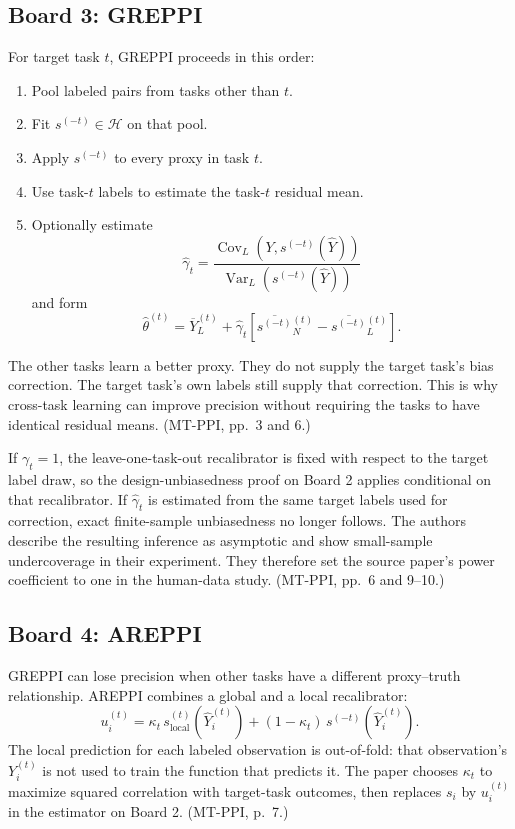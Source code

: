 \documentclass[11pt]{article}
\newcommand{\Var}{\operatorname{Var}}
\newcommand{\Cov}{\operatorname{Cov}}
\begin{document}
  \subsection*{Board 3: GREPPI}
  
  For target task \(t\), GREPPI proceeds in this order:
  \begin{enumerate}[leftmargin=2em]
      \item Pool labeled pairs from tasks other than \(t\).
      \item Fit \(s^{(-t)}\in\mathcal H\) on that pool.
      \item Apply \(s^{(-t)}\) to every proxy in task \(t\).
      \item Use task-\(t\) labels to estimate the task-\(t\) residual mean.
      \item Optionally estimate
      \[
          \widehat\gamma_t
          =
          \frac{\Cov_L(Y,s^{(-t)}(\widehat Y))}
               {\Var_L(s^{(-t)}(\widehat Y))}
      \]
      and form
      \[
          \widehat\theta^{(t)}
          =
          \overline Y_L^{(t)}
          +
          \widehat\gamma_t
          \left[
            \overline{s^{(-t)}}{}_N^{(t)}
            -
            \overline{s^{(-t)}}{}_L^{(t)}
          \right].
      \]
  \end{enumerate}
  The other tasks learn a better proxy. They do not supply the target task's
  bias correction. The target task's own labels still supply that correction.
  This is why cross-task learning can improve precision without requiring the
  tasks to have identical residual means. (MT-PPI, pp.~3 and 6.)
  
  If \(\gamma_t=1\), the leave-one-task-out recalibrator is fixed with respect to
  the target label draw, so the design-unbiasedness proof on Board 2 applies
  conditional on that recalibrator. If \(\widehat\gamma_t\) is estimated from
  the same target labels used for correction, exact finite-sample unbiasedness
  no longer follows. The authors describe the resulting inference as
  asymptotic and show small-sample undercoverage in their experiment. They
  therefore set the source paper's power coefficient to one in the human-data
  study. (MT-PPI, pp.~6 and 9--10.)
  
  \subsection*{Board 4: AREPPI}
  
  GREPPI can lose precision when other tasks have a different proxy--truth
  relationship. AREPPI combines a global and a local recalibrator:
  \[
      u_i^{(t)}
      =
      \kappa_t\,s_{\mathrm{local}}^{(t)}
          (\widehat Y_i^{(t)})
      +(1-\kappa_t)\,s^{(-t)}
          (\widehat Y_i^{(t)}).
  \]
  The local prediction for each labeled observation is out-of-fold: that
  observation's \(Y_i^{(t)}\) is not used to train the function that predicts it.
  The paper chooses \(\kappa_t\) to maximize squared correlation with target-task
  outcomes, then replaces \(s_i\) by \(u_i^{(t)}\) in the estimator on Board 2.
  (MT-PPI, p.~7.)
  
\end{document}
